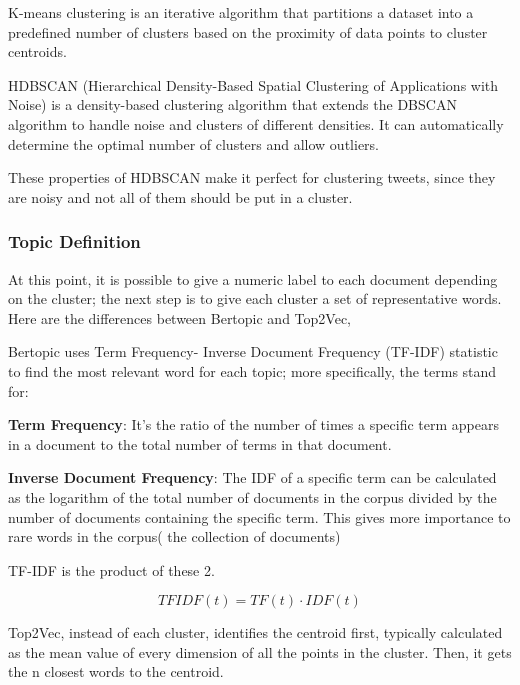 K-means clustering \cite{jin_k-means_2010} is an iterative algorithm that partitions a dataset into a predefined number of clusters based on the proximity of data points to cluster centroids.

HDBSCAN  \cite{mcinnes_hdbscan_2017}(Hierarchical Density-Based Spatial Clustering of Applications with Noise) is a density-based clustering algorithm that extends the DBSCAN algorithm to handle noise and clusters of different densities. It can automatically determine the optimal number of clusters and allow outliers.

These properties of HDBSCAN make it perfect for clustering tweets, since they are noisy and not all  of them should be put in a cluster.

\subsubsection{Topic Definition}
At this point, it is possible to give a numeric label to each document depending on the cluster; the next step is to give each cluster a set of representative words.
 Here are the differences between Bertopic and Top2Vec,

Bertopic uses Term Frequency- Inverse Document Frequency (TF-IDF) \cite{rajaraman_data_2011}  statistic to find the most relevant word for each topic; more specifically, the terms stand for:

\textbf{Term Frequency}: It's the ratio of the number of times a specific term appears in a document to the total number of terms in that document.

\textbf{Inverse Document Frequency}: The IDF of a specific term can be calculated as the logarithm of the total number of documents in the corpus divided by the number of documents containing the specific term. This gives more importance to rare words in the corpus( the collection of documents) 

TF-IDF is the product of these 2.

\begin{equation}
    TFIDF(t) = TF(t) \cdot IDF(t)
\end{equation}



Top2Vec, instead of each cluster,  identifies the centroid first, typically calculated as the mean value of every dimension of all the points in the cluster. Then, it gets the n closest words to the centroid.


